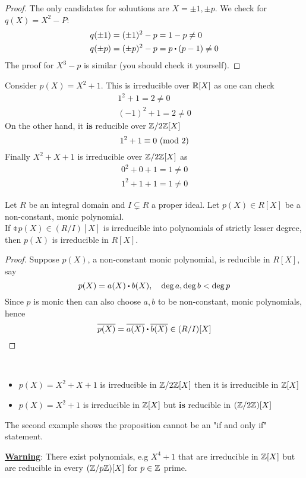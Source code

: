 \documentclass[../Main.tex]{subfiles}
\begin{document}
\begin{proof}
	The only candidates for soluutions are $X=\pm 1, \pm p$. We check for $q(X)=X^2-P$:
	\begin{align*}
	&q(\pm 1) = (\pm 1)^2-p = 1-p \ne 0\\
	&q(\pm p) = (\pm p)^2-p = p\rdot (p-1)\ne 0
	\end{align*}
	The proof for $X^3-p$ is similar (you should check it yourself).
\end{proof}
\begin{example}
	Consider $p(X)=X^2+1$. This is irreducible over $\mathbb{R}[X]$ as one can check
	\begin{align*}
	1^2+1=2 \ne 0\\
	(-1)^2+1=2\ne 0
	\end{align*}
	On the other hand, it \textbf{is} reducible over $\mathbb{Z}/2\mathbb{Z}[X]$ 
	\[1^2+1 \equiv 0 \ (\mathrm{mod}\ 2)\]
	Finally $X^2+X+1$ is irreducible over $\mathbb{Z}/2\mathbb{Z}[X]$ as
	\begin{align*}
	0^2+0+1=1\ne 0\\
	1^2+1+1=1\ne 0
	\end{align*}
\end{example}
\begin{prop}
	Let $R$ be an integral domain and $I\subsetneq R$ a proper ideal. Let $p(X) \in R[X]$ be a non-constant, monic polynomial.\\
	If $\obar{p(X)} \in (R/I)[X]$ is irreducible into polynomials of strictly lesser degree, then $p(X)$ is irreducible in $R[X]$.
\end{prop}
\begin{proof}
	Suppose $p(X)$, a non-constant monic polynomial, is reducible in $R[X]$, say
	\[p(X)=a(X)\rdot b(X),\quad \deg a, \deg b< \deg p\]
	Since $p$ is monic then can also choose $a,b$ to be non-constant, monic polynomials, hence
	\[\obar{p(X)} = \obar{a(X)}\rdot \obar{b(X)} \in (R/I)[X]\qedhere\]
\end{proof}
\begin{example}~
	\begin{itemize}
		\item $p(X)=X^2+X+1$ is irreducible in $\mathbb{Z}/2\mathbb{Z}[X]$ then it is irreducible in $\mathbb{Z}[X]$
		\item $p(X)=X^2+1$ is irreducible in $\mathbb{Z}[X]$ but \textbf{is} reducible in $(\mathbb{Z}/2\mathbb{Z})[X]$
	\end{itemize}
	The second example shows the proposition cannot be an "if and only if" statement.
\end{example}
\textbf{\textcolor{BrickRed}{\underline{Warning}}}: There exist polynomials, e.g $X^4+1$ that are irreducible in $\mathbb{Z}[X]$ but are reducible in every $(\mathbb{Z}/p\mathbb{Z})[X]$ for $p\in \mathbb{Z} $ prime.
\end{document}
